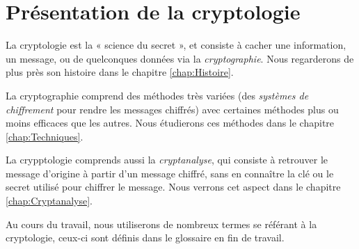 \section{Présentation de la cryptologie}
La cryptologie est la « science du secret », et consiste à cacher une
information, un message, ou de quelconques données via la
\emph{cryptographie}. Nous regarderons de plus près son histoire
dans le chapitre \ref{chap:Histoire}.

La cryptographie comprend des méthodes très variées (des
\emph{systèmes de chiffrement} pour rendre les messages chiffrés)
avec certaines méthodes plus ou moins efficaces que les autres.
Nous étudierons ces méthodes dans le chapitre
\ref{chap:Techniques}.

La crypptologie comprends aussi la \emph{cryptanalyse}, qui consiste à
retrouver le message d'origine à partir d'un message chiffré, sans en
connaître la clé ou le secret utilisé pour chiffrer le message.
Nous verrons cet aspect dans le chapitre \ref{chap:Cryptanalyse}.

Au cours du travail, nous utiliserons de nombreux termes se référant à
la cryptologie, ceux-ci sont définis dans le glossaire en fin de travail.
